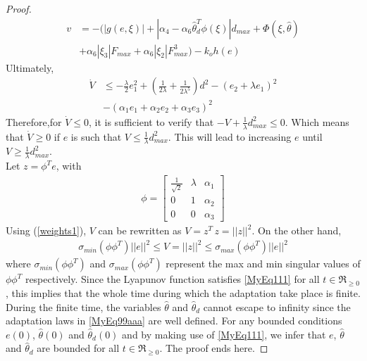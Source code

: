 \documentclass{article} %
\newtheorem{proof}{Proof}
\begin{document}
\begin{proof}
\begin{equation} \label{MyEq110}
  \begin{split}
  v&=-(|g(e,\xi)|+|\alpha_4-\alpha_6{\hat \theta}^T_d\phi(\xi)|d_{max}+\Phi(\xi,\hat \theta)\\
  &+\alpha_6|\xi_3|F_{max}+\alpha_6|\xi_2|F^3_{max})-k_oh(e)
  \end{split}
\end{equation}
Ultimately,
\begin{equation} \label{MyEq111}
  \begin{split}
{\dot V}  &\leq -\tfrac{\lambda}{2} e_1^2+ (\tfrac{1}{2\lambda}+\tfrac{1}{2\lambda^5})d^2-(e_2+ \lambda e_1)^2\\
&-(\alpha_1 e_1 + \alpha_2 e_2 + \alpha_3 e_3)^2
  \end{split}
\end{equation}
Therefore,for ${\dot V} \leq 0$, it is sufficient to verify that $-V  +\tfrac{1}{\lambda}d_{max}^2 \leq 0$. Which means that ${\dot V} \geq 0$ if $e$ is such that $V \leq \tfrac{1}{\lambda}d_{max}^2$. This will lead to increasing $e$ until $V \geq \tfrac{1}{\lambda}d_{max}^2$.\\
Let $z=\phi^T e$, with
\begin{equation} \label{weights1}
  \begin{split}
\phi = \left[ \begin{array}{lll} \frac{1}{\sqrt{2}}&\lambda&\alpha_1\\ 0 & 1 & \alpha_2\\ 0& 0&\alpha_3 \end{array}\right]
\end{split}
\end{equation}
Using (\ref{weights1}), $V$ can be rewritten as $V=z^T\,z=||z||^2$. On the other hand,
\begin{equation} \label{weights2}
  \begin{split}
\sigma_{min}(\phi \phi^T)||e||^2\leq V=||z||^2 \leq \sigma_{max}(\phi \phi^T)||e||^2
\end{split}
\end{equation}
where $\sigma_{min}(\phi \phi^T)$ and $\sigma_{max}(\phi \phi^T)$ represent the max and min singular values of $\phi \phi^T$ respectively.
Since the Lyapunov function satisfies \eqref{MyEq111} for all $t \in \Re_{\geq0}$, this implies that the whole time during which the adaptation take place is finite. During the finite time, the variables $\hat \theta$ and ${\hat \theta}_d$ cannot escape to infinity since the adaptation laws in \eqref{MyEq99aaa} are well defined. For any bounded conditions $e(0)$, ${\hat \theta}(0)$ and ${\hat \theta}_d(0)$ and by making use of \eqref{MyEq111}, we infer that $e$, ${\hat \theta}$ and ${\hat \theta}_d$ are bounded for all $t \in \Re_{\geq0}$. The proof ends here.
\end{proof}
\end{document}
